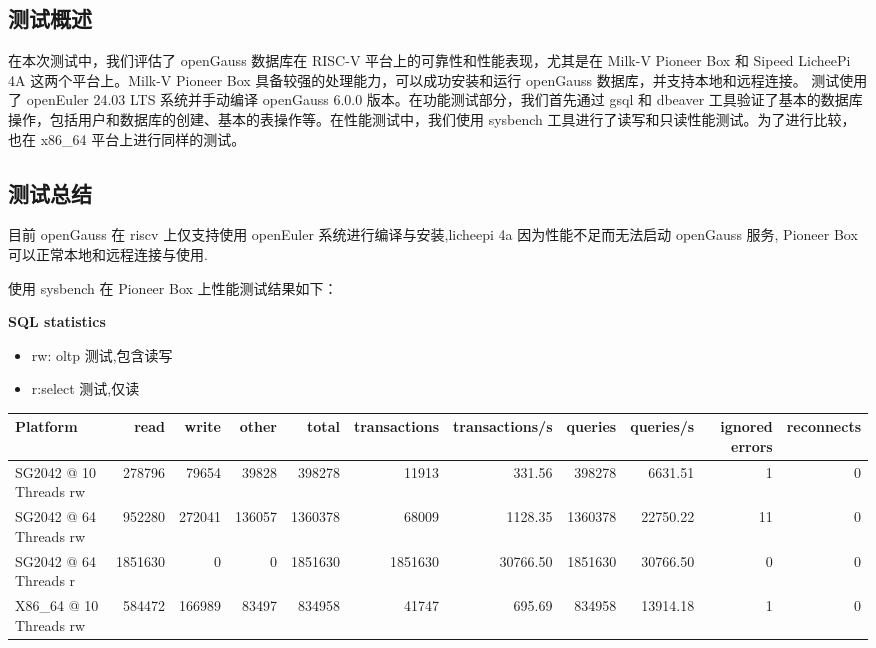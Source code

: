 \documentclass{article}
\begin{document}
\subsection{测试概述}
在本次测试中，我们评估了 openGauss 数据库在 RISC-V 平台上的可靠性和性能表现，尤其是在 Milk-V Pioneer Box 和 Sipeed LicheePi 4A 这两个平台上。Milk-V Pioneer Box 具备较强的处理能力，可以成功安装和运行 openGauss 数据库，并支持本地和远程连接。
测试使用了 openEuler 24.03 LTS 系统并手动编译 openGauss 6.0.0 版本。在功能测试部分，我们首先通过 gsql 和 dbeaver 工具验证了基本的数据库操作，包括用户和数据库的创建、基本的表操作等。在性能测试中，我们使用 sysbench 工具进行了读写和只读性能测试。为了进行比较，也在 x86\_64 平台上进行同样的测试。

\subsection{测试总结}
目前 openGauss 在 riscv 上仅支持使用 openEuler 系统进行编译与安装,licheepi 4a 因为性能不足而无法启动 openGauss 服务,
Pioneer Box 可以正常本地和远程连接与使用.

使用 sysbench 在 Pioneer Box 上性能测试结果如下：

\textbf{SQL statistics}

\begin{itemize}
    \item rw: oltp 测试,包含读写 
    \item r:select 测试,仅读
\end{itemize}

\begin{table}[h]
\centering
\begin{tabular}{|l|r|r|r|r|r|r|r|r|r|r|}
\hline
Platform & read & write & other & total & transactions & transactions/s & queries & queries/s & ignored errors & reconnects \\
\hline
SG2042 @ 10 Threads rw & 278796 & 79654 & 39828 & 398278 & 11913 & 331.56 & 398278 & 6631.51 & 1 & 0 \\
SG2042 @ 64 Threads rw & 952280 & 272041 & 136057 & 1360378 & 68009 & 1128.35 & 1360378 & 22750.22 & 11 & 0 \\
SG2042 @ 64 Threads r  & 1851630 & 0      & 0      & 1851630 & 1851630 & 30766.50 & 1851630 & 30766.50 & 0 & 0 \\
X86\_64 @ 10 Threads rw & 584472 & 166989 & 83497 & 834958 & 41747 & 695.69 & 834958 & 13914.18 & 1 & 0 \\
\hline
\end{tabular}
\end{table}
\end{document}
